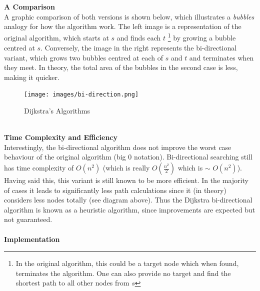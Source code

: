 \documentclass[paper=a4, fontsize=11pt]{scrartcl} %
\begin{document}
{\bf A Comparison}\\
{A graphic comparison of both versions is shown below, which illustrates a {\it bubbles} analogy for how the algorithm work. The left image is a representation of the original algorithm, which starts at $s$ and finds each $t$ \footnote{In the original algorithm, this could be a target node which when found, terminates the algorithm. One can also provide no target and find the shortest path to all other nodes from $s$} by growing a bubble centred at $s$. Conversely, the image in the right represents the bi-directional variant, which grows two bubbles centred at each of $s$ and $t$ and terminates when they meet. In theory, the total area of the bubbles in the second case is less, making it quicker.      }
\begin{figure}[h]
\centering
\texttt{[image: images/bi-direction.png]}
\caption{Dijkstra's Algorithms \cite{theBook}}
\end{figure}\\
{\bf Time Complexity and Efficiency}\\
{Interestingly, the bi-directional algorithm does not improve the worst case behaviour of the original algorithm (big 0 notation). Bi-directional searching still has time complexity of $O(n^2)$ (which is really $O(\frac{n^2}{2})$ which is $\sim$ $O(n^2)$). Having said this, this variant is still known to be more efficient. In the majority of cases it leads to significantly less path calculations since it (in theory) considers less nodes totally (see diagram above). Thus the Dijkstra bi-directional algorithm is known as a heuristic algorithm, since improvements are expected but not guaranteed.  } \\\\
{\bf Implementation}\\
\end{document}
